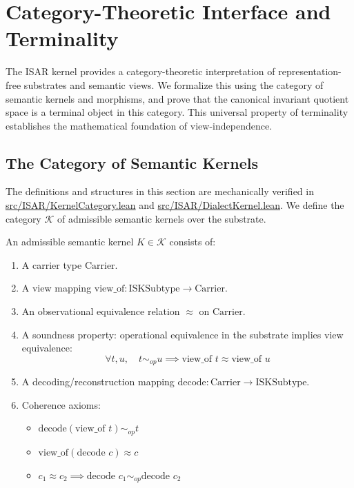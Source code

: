 \chapter{Category-Theoretic Interface and Terminality}

The ISAR kernel provides a category-theoretic interpretation of representation-free substrates and semantic views. We formalize this using the category of semantic kernels and morphisms, and prove that the canonical invariant quotient space is a terminal object in this category. This universal property of terminality establishes the mathematical foundation of view-independence.

\section{The Category of Semantic Kernels}

The definitions and structures in this section are mechanically verified in \url{src/ISAR/KernelCategory.lean} and \url{src/ISAR/DialectKernel.lean}. We define the category $\mathcal{K}$ of admissible semantic kernels over the substrate.

\begin{definition}
An admissible semantic kernel $K \in \mathcal{K}$ consists of:
\begin{enumerate}
    \item A carrier type $\text{Carrier}$.
    \item A view mapping $\text{view\_of} : \text{ISKSubtype} \to \text{Carrier}$.
    \item An observational equivalence relation $\approx$ on $\text{Carrier}$.
    \item A soundness property: operational equivalence in the substrate implies view equivalence:
    $$\forall t, u, \quad t \sim_{op} u \implies \text{view\_of } t \approx \text{view\_of } u$$
    \item A decoding/reconstruction mapping $\text{decode} : \text{Carrier} \to \text{ISKSubtype}$.
    \item Coherence axioms:
    \begin{itemize}
        \item $\text{decode}(\text{view\_of } t) \sim_{op} t$
        \item $\text{view\_of}(\text{decode } c) \approx c$
        \item $c_1 \approx c_2 \implies \text{decode } c_1 \sim_{op} \text{decode } c_2$
    \end{itemize}
\end{enumerate}
\end{definition}

